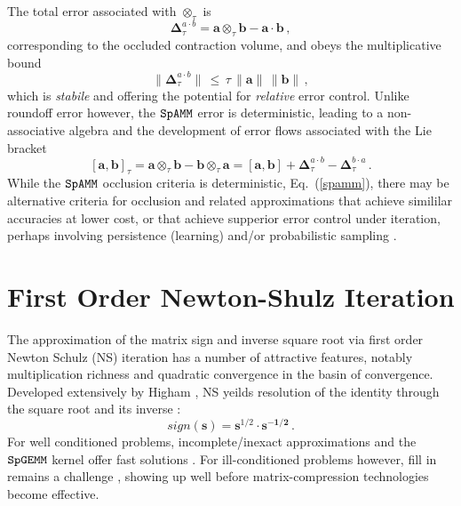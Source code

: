 \documentclass[letterpaper,twocolumn,amsmath,amsfont,amssymb,english,aps,jcp,preprintnumbers,groupaddress,nofootinbib,tightenlines]{revtex4}
\newcommand{\mat}[1]{\boldsymbol{#1}}
\newcommand{\ot}{ {\scriptstyle \otimes}_{ \tau } }
\begin{document}
The total error associated with $\ot$ is 
\begin{equation}
\mat{\Delta}^{a\cdot b}_{\tau}=\mat{a} \ot \mat{b}-\mat{a}\cdot \mat{b} \, ,
\end{equation}
corresponding to the occluded contraction volume, and obeys the multiplicative bound 
\begin{equation}
\lVert \mat{\Delta}^{a \cdot b}_{\tau} \rVert \, \leq \, \tau \, \lVert \mat{a} \rVert  \,  \lVert \mat{b} \rVert \, ,
\end{equation}
which is {\em stabile} \cite{DemmelnHolz2007} and offering the potential for {\em relative} error control.
Unlike roundoff error however, the $\tt SpAMM$ error is deterministic,
leading to a non-associative algebra and the development of error flows associated with the Lie bracket
\begin{equation}
\left[ \mat{a} , \mat{b} \right]_{\tau} = \mat{a} \ot \mat{b}-\mat{b} \ot \mat{a}  
=  \left[ \mat{a} , \mat{b} \right]
+ \mat{\Delta}^{a\cdot b}_{\tau} -\mat{\Delta}^{b\cdot a}_{\tau} \,.
\end{equation}
While the $\tt SpAMM$ occlusion criteria is deterministic, Eq.~(\ref{spamm}), 
there may be alternative criteria for occlusion and related approximations that 
achieve simililar accuracies at lower cost, or that achieve supperior error control under iteration, 
perhaps involving persistence (learning) and/or probabilistic sampling \cite{Drineas}.  

\section{First Order Newton-Shulz Iteration}

The approximation of the matrix sign and inverse square root via first order Newton Schulz (NS) iteration 
has a number of attractive features, notably multiplication richness and quadratic convergence in the basin of convergence. 
Developed extensively by Higham \cite{}, NS  yeilds resolution of the identity through the square root and its inverse \cite{}:
\begin{equation}
sign \left( \mat{s} \right) =\mat{s}^{1/2} \cdot \mat{s^{-1/2}} \, .
\end{equation}
For well conditioned problems, incomplete/inexact approximations and the $\tt SpGEMM$ kernel offer fast solutions \cite{}.
For ill-conditioned problems however, fill in remains a challenge \cite{}, showing up well before matrix-compression 
technologies become effective.   
\end{document}
